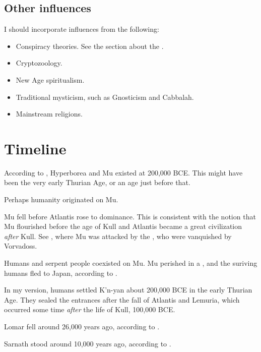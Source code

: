 \documentclass[a4paper,12pt,openany,oneside]{book}
\begin{document}
\section{Other influences}
I should incorporate influences from the following:

\begin{itemize}
  \item 
    Conspiracy theories. 
    See the section about the .
  \item 
    Cryptozoology. 
  \item 
    New Age spiritualism.
  \item 
    Traditional mysticism, such as Gnosticism and Cabbalah.
  \item 
    Mainstream religions.
\end{itemize}























\chapter{Timeline}
According to \cite{HPLovecraft:OutoftheAeons}, Hyperborea and Mu existed at 200,000 BCE. 
This might have been the very early Thurian Age, or an age just before that.

Perhaps humanity originated on Mu. 

Mu fell before Atlantis rose to dominance. 
This is consistent with the notion that Mu flourished before the age of Kull and Atlantis became a great civilization \emph{after} Kull.
See \cite[p.95]{HenryKuttner:TheInvaders}, where Mu was attacked by the , who were vanquished by Vorvadoss.

Humans and serpent people coexisted on Mu.
Mu perished in a , and the suriving humans fled to Japan, according to \cite{RPG:CallofCthulhu:SecretsofJapan}.

In my version, humans settled K'n-yan about 200,000 BCE in the early Thurian Age.
They sealed the entrances after the fall of Atlantis and Lemuria, which occurred some time \emph{after} the life of Kull, 100,000 BCE.

Lomar fell around 26,000 years ago, according to \cite{HPLovecraft:Polaris}. 

Sarnath stood around 10,000 years ago, according to \cite{HPLovecraft:TheDoomthatCametoSarnath}. 
























\end{document}
